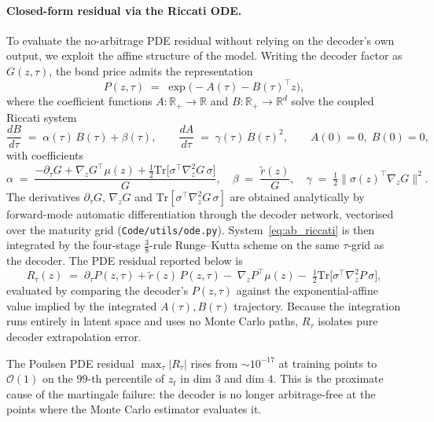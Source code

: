 \paragraph{Closed-form residual via the Riccati ODE.}
To evaluate the no-arbitrage PDE residual without relying on the
decoder's own output, we exploit the affine structure of the model.
Writing the decoder factor as $G(z,\tau)$, the bond price admits the
representation \citep{Poulsen2024}
\[
  P(z,\tau)\;=\;\exp\!\bigl(-A(\tau)-B(\tau)^{\!\top}z\bigr),
\]
where the coefficient functions $A:\mathbb{R}_{+}\!\to\!\mathbb{R}$
and $B:\mathbb{R}_{+}\!\to\!\mathbb{R}^{d}$ solve the coupled Riccati
system
\begin{equation}
  \frac{dB}{d\tau} \;=\; \alpha(\tau)\,B(\tau) + \beta(\tau),
  \qquad
  \frac{dA}{d\tau} \;=\; \gamma(\tau)\,B(\tau)^{2},
  \qquad A(0)=0,\;B(0)=0,
  \label{eq:ab_riccati}
\end{equation}
with coefficients
\[
  \alpha \;=\; \frac{-\partial_\tau G + \nabla_{\!z}G^{\!\top}\mu(z) + \tfrac12\mathrm{Tr}\bigl[\sigma^{\!\top}\nabla_{\!z}^{2}G\,\sigma\bigr]}{G},
  \quad
  \beta  \;=\; \frac{\tilde r(z)}{G},
  \quad
  \gamma \;=\; \tfrac12\bigl\lVert\sigma(z)^{\!\top}\nabla_{\!z}G\bigr\rVert^{2}.
\]
The derivatives $\partial_\tau G$, $\nabla_{\!z}G$ and
$\mathrm{Tr}[\sigma^{\!\top}\nabla_{\!z}^{2}G\,\sigma]$ are obtained
analytically by forward-mode automatic differentiation through the
decoder network, vectorised over the maturity grid
(\texttt{Code/utils/ode.py}). System~\eqref{eq:ab_riccati} is then
integrated by the four-stage \(\tfrac{3}{8}\)-rule Runge--Kutta scheme
on the same $\tau$-grid as the decoder. The PDE residual reported
below is
\[
  R_\tau(z)
  \;=\;
  \partial_\tau P(z,\tau) + \tilde r(z)\,P(z,\tau)
  -\;\nabla_{\!z}P^{\!\top}\mu(z)
  -\;\tfrac12\mathrm{Tr}\bigl[\sigma^{\!\top}\nabla_{\!z}^{2}P\,\sigma\bigr],
\]
evaluated by comparing the decoder's $P(z,\tau)$ against the
exponential-affine value implied by the integrated $A(\tau),B(\tau)$
trajectory. Because the integration runs entirely in latent space and
uses no Monte Carlo paths, $R_\tau$ isolates pure decoder
extrapolation error.

The Poulsen PDE residual $\max_\tau\lvert R_\tau\rvert$ rises from
$\sim 10^{-17}$ at training points to $\mathcal O(1)$ on the $99$-th
percentile of $z_t$ in dim $3$ and dim $4$. This is the proximate
cause of the martingale failure: the decoder is no longer
arbitrage-free at the points where the Monte Carlo estimator
evaluates it.

